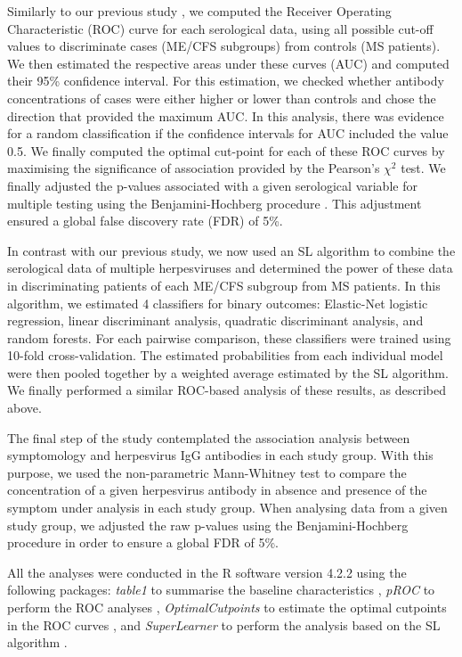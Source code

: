Similarly to our previous study \citep{domingues2021HerpesvirusesSerologya}, we computed the Receiver Operating Characteristic (ROC) curve for each serological data, using all possible cut-off values to discriminate cases (ME/CFS subgroups) from controls (MS patients). We then estimated the respective areas under these curves (AUC) and computed their 95\% confidence interval. For this estimation, we checked whether antibody concentrations of cases were either higher or lower than controls and chose the direction that provided the maximum AUC. In this analysis, there was evidence for a random classification if the confidence intervals for AUC included the value 0.5. We finally computed the optimal cut-point for each of these ROC curves by maximising the significance of association provided by the Pearson's $\chi^2$ test. We finally adjusted the p-values associated with a given serological variable for multiple testing using the Benjamini-Hochberg procedure \citep{benjaminiControllingFalseDiscovery1995}. This adjustment ensured a global false discovery rate (FDR) of 5\%.

In contrast with our previous study, we now used an SL algorithm \citep{laan2007SuperLearner} to combine the serological data of multiple herpesviruses and determined the power of these data in discriminating patients of each ME/CFS subgroup from MS patients. In this algorithm, we estimated 4 classifiers for binary outcomes: Elastic-Net logistic regression, linear discriminant analysis, quadratic discriminant analysis, and random forests. For each pairwise comparison, these classifiers were trained using 10-fold cross-validation. The estimated probabilities from each individual model were then pooled together by a weighted average estimated by the SL algorithm. We finally performed a similar ROC-based analysis of these results, as described above.

The final step of the study contemplated the association analysis between symptomology and herpesvirus IgG antibodies in each study group. With this purpose, we used the non-parametric Mann-Whitney test to compare the concentration of a given herpesvirus antibody in absence and presence of the symptom under analysis in each study group. When analysing data from a given study group, we adjusted the raw p-values using the Benjamini-Hochberg procedure in order to ensure a global FDR of 5\%.

All the analyses were conducted in the R software version 4.2.2 \citep{rcoreteamLanguageEnvironmentStatistical2020} using the following packages: \textit{table1} to summarise the baseline characteristics \citep{rich2023Table1Tables}, \textit{pROC} to perform the ROC analyses \citep{pRoccite}, \textit{OptimalCutpoints} to estimate the optimal cutpoints in the ROC curves \citep{OptimalCutpointscite}, and \textit{SuperLearner} to perform the analysis based on the SL algorithm \citep{polley2023SuperLearnerSuper}.

